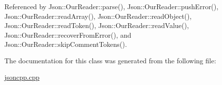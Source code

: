 Referenced by Json\+::\+Our\+Reader\+::parse(), Json\+::\+Our\+Reader\+::push\+Error(), Json\+::\+Our\+Reader\+::read\+Array(), Json\+::\+Our\+Reader\+::read\+Object(), Json\+::\+Our\+Reader\+::read\+Token(), Json\+::\+Our\+Reader\+::read\+Value(), Json\+::\+Our\+Reader\+::recover\+From\+Error(), and Json\+::\+Our\+Reader\+::skip\+Comment\+Tokens().



The documentation for this class was generated from the following file\+:\begin{DoxyCompactItemize}
\item 
\hyperlink{jsoncpp_8cpp}{jsoncpp.\+cpp}\end{DoxyCompactItemize}
